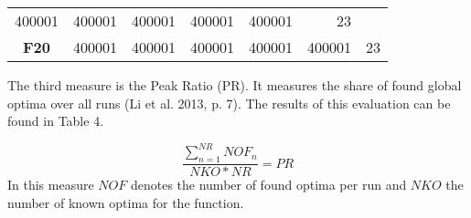 \documentclass[12pt,a4paper]{article}
\begin{document}
\begin{longtable}[c]{@{}crrrrrr@{}}
\begin{minipage}[t]{0.08\columnwidth}
400001
\strut\end{minipage} &
\begin{minipage}[t]{0.08\columnwidth}\raggedleft\strut
400001
\strut\end{minipage} &
\begin{minipage}[t]{0.09\columnwidth}\raggedleft\strut
400001
\strut\end{minipage} &
\begin{minipage}[t]{0.10\columnwidth}\raggedleft\strut
400001
\strut\end{minipage} &
\begin{minipage}[t]{0.11\columnwidth}\raggedleft\strut
400001
\strut\end{minipage} &
\begin{minipage}[t]{0.07\columnwidth}\raggedleft\strut
23
\strut\end{minipage}\tabularnewline
\begin{minipage}[t]{0.11\columnwidth}\centering\strut
\textbf{F20}
\strut\end{minipage} &
\begin{minipage}[t]{0.08\columnwidth}\raggedleft\strut
400001
\strut\end{minipage} &
\begin{minipage}[t]{0.08\columnwidth}\raggedleft\strut
400001
\strut\end{minipage} &
\begin{minipage}[t]{0.09\columnwidth}\raggedleft\strut
400001
\strut\end{minipage} &
\begin{minipage}[t]{0.10\columnwidth}\raggedleft\strut
400001
\strut\end{minipage} &
\begin{minipage}[t]{0.11\columnwidth}\raggedleft\strut
400001
\strut\end{minipage} &
\begin{minipage}[t]{0.07\columnwidth}\raggedleft\strut
23
\strut\end{minipage}\tabularnewline
\bottomrule
\end{longtable}

The third measure is the Peak Ratio (PR). It measures the share of found
global optima over all runs (Li et al. 2013, p. 7). The results of this
evaluation can be found in Table 4.

\[\frac{\sum\nolimits_{n=1}^{NR} NOF_{n}}{NKO * NR} = PR\] \newline
In this measure \(NOF\) denotes the number of found optima per run and
\(NKO\) the number of known optima for the function. \newline
\end{document}
